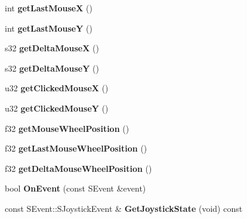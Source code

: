 \begin{DoxyCompactItemize}
\item 
\hypertarget{class_c_irr_event_receiver_a8f353837db37900e4150874476d84af2}{
int {\bfseries getLastMouseX} ()}
\label{class_c_irr_event_receiver_a8f353837db37900e4150874476d84af2}

\item 
\hypertarget{class_c_irr_event_receiver_a30da8e16726888ff6c73791378b1968a}{
int {\bfseries getLastMouseY} ()}
\label{class_c_irr_event_receiver_a30da8e16726888ff6c73791378b1968a}

\item 
\hypertarget{class_c_irr_event_receiver_abfbbb6c826f31798f7749828d0c25d9f}{
s32 {\bfseries getDeltaMouseX} ()}
\label{class_c_irr_event_receiver_abfbbb6c826f31798f7749828d0c25d9f}

\item 
\hypertarget{class_c_irr_event_receiver_ab0f00fd77bf6e9a922dce57c43111929}{
s32 {\bfseries getDeltaMouseY} ()}
\label{class_c_irr_event_receiver_ab0f00fd77bf6e9a922dce57c43111929}

\item 
\hypertarget{class_c_irr_event_receiver_aeaca824a2fa807442076a8557bab803b}{
u32 {\bfseries getClickedMouseX} ()}
\label{class_c_irr_event_receiver_aeaca824a2fa807442076a8557bab803b}

\item 
\hypertarget{class_c_irr_event_receiver_a943275bf25b64902d56653ef143d8ab3}{
u32 {\bfseries getClickedMouseY} ()}
\label{class_c_irr_event_receiver_a943275bf25b64902d56653ef143d8ab3}

\item 
\hypertarget{class_c_irr_event_receiver_ab903a6df58bbd06b0921e447f4424f9a}{
f32 {\bfseries getMouseWheelPosition} ()}
\label{class_c_irr_event_receiver_ab903a6df58bbd06b0921e447f4424f9a}

\item 
\hypertarget{class_c_irr_event_receiver_acd28bd55a3e0e57d839dfca2bb2a8c3e}{
f32 {\bfseries getLastMouseWheelPosition} ()}
\label{class_c_irr_event_receiver_acd28bd55a3e0e57d839dfca2bb2a8c3e}

\item 
\hypertarget{class_c_irr_event_receiver_ae41b286555fa2a1e69a997c617f07e07}{
f32 {\bfseries getDeltaMouseWheelPosition} ()}
\label{class_c_irr_event_receiver_ae41b286555fa2a1e69a997c617f07e07}

\item 
\hypertarget{class_c_irr_event_receiver_aa0902a7142bcdafec390614728d95df7}{
bool {\bfseries OnEvent} (const SEvent \&event)}
\label{class_c_irr_event_receiver_aa0902a7142bcdafec390614728d95df7}

\item 
\hypertarget{class_c_irr_event_receiver_a47cf35a7132c44ff43b9c3f3e5161444}{
const SEvent::SJoystickEvent \& {\bfseries GetJoystickState} (void) const }
\label{class_c_irr_event_receiver_a47cf35a7132c44ff43b9c3f3e5161444}

\end{DoxyCompactItemize}
